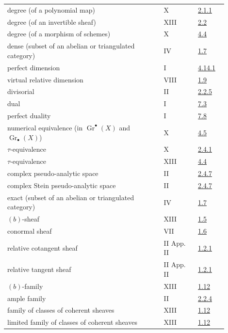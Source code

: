 \begin{longtable}{@{}>{\raggedright\arraybackslash}p{0.64\linewidth}>{\raggedright\arraybackslash}p{0.14\linewidth}>{\raggedright\arraybackslash}p{0.12\linewidth}@{}}
degree (of a polynomial map) & X & \hyperlink{sga6.e10.def.2-1-1}{2.1.1}\\
degree (of an invertible sheaf) & XIII & \hyperlink{sga6.e13.para.2-2}{2.2}\\
degree (of a morphism of schemes) & X & \hyperlink{sga6.e10.sec.4.4}{4.4}\\
dense (subset of an abelian or triangulated category) & IV & \hyperlink{sga6.e04.def.1-7}{1.7}\\
perfect dimension & I & \hyperlink{sga6.e01.def.4-14-1}{4.14.1}\\
virtual relative dimension & VIII & \hyperlink{sga6.e08.def.1-9}{1.9}\\
divisorial & II & \hyperlink{sga6.e02.def.2-2-5}{2.2.5}\\
dual & I & \hyperlink{sga6.e01.def.7-3}{7.3}\\
perfect duality & I & \hyperlink{sga6.e01.cor.7-8}{7.8}\\
numerical equivalence (in \(\operatorname{Gr}^\bullet(X)\) and \(\operatorname{Gr}_\bullet(X)\)) & X & \hyperlink{sga6.e10.sec.4.5}{4.5}\\
\(\tau\)-equivalence & X & \hyperlink{sga6.e10.def.2-4-1}{2.4.1}\\
\(\tau\)-equivalence & XIII & \hyperlink{sga6.e13.para.4-4}{4.4}\\
complex pseudo-analytic space & II & \hyperlink{sga6.e02.def.2-4-7}{2.4.7}\\
complex Stein pseudo-analytic space & II & \hyperlink{sga6.e02.def.2-4-7}{2.4.7}\\
exact (subset of an abelian or triangulated category) & IV & \hyperlink{sga6.e04.def.1-7}{1.7}\\
\((b)\)-sheaf & XIII & \hyperlink{sga6.e13.def.1-5}{1.5}\\
conormal sheaf & VII & \hyperlink{sga6.e07.def.1-6}{1.6}\\
relative cotangent sheaf & II App. II & \hyperlink{sga6.e02.para.1-2-1}{1.2.1}\\
relative tangent sheaf & II App. II & \hyperlink{sga6.e02.para.1-2-1}{1.2.1}\\
\((b)\)-family & XIII & \hyperlink{sga6.e13.para.1-12}{1.12}\\
ample family & II & \hyperlink{sga6.e02.def.2-2-4}{2.2.4}\\
family of classes of coherent sheaves & XIII & \hyperlink{sga6.e13.para.1-12}{1.12}\\
limited family of classes of coherent sheaves & XIII & \hyperlink{sga6.e13.para.1-12}{1.12}\\

\end{longtable}
